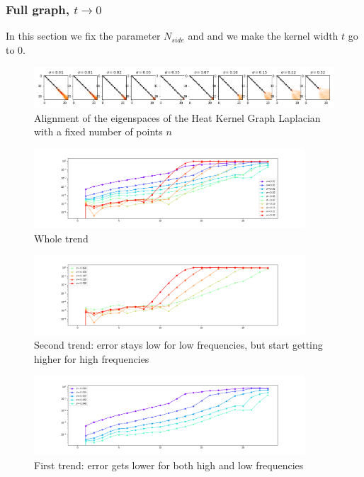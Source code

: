 \subsubsection{Full graph, $t\to 0$}
In this section we fix the parameter $N_{side}$ and and we make the kernel width $t$ go to $0$. 
\begin{figure}[h]
	\label{fig:t_sensitivity_eigenspaces}
	\caption{Alignment of the eigenspaces of the Heat Kernel Graph Laplacian with a fixed number of points $n$}
	\centering
	\includegraphics[width=1\textwidth]{../codes/02.HeatKernelGraphLaplacian/HEALPix/06_figures/t_sensitivity.png}
	
\end{figure}
\begin{figure}
	\centering
	\includegraphics[width=0.9\textwidth]{../codes/02.HeatKernelGraphLaplacian/HEALPix/06_figures/t_sensitivity_diagonal.png}
	\caption{Whole trend}
	\label{fig:t_sensitivity_diagonal}
\end{figure}%
\begin{figure}
	\centering
	\includegraphics[width=0.9\textwidth]{../codes/02.HeatKernelGraphLaplacian/HEALPix/06_figures/t_sensitivity_diagonal_2.png}
	\caption{Second trend: error stays low for low frequencies, but start getting higher for high frequencies}
	\label{fig:t_sensitivity_diagonal_2}
	\vspace{0.5cm}
\end{figure}
\begin{figure}
	\centering
	\includegraphics[width=0.9\textwidth]{../codes/02.HeatKernelGraphLaplacian/HEALPix/06_figures/t_sensitivity_diagonal_1.png}
	\caption{First trend: error gets lower for both high and low frequencies}
	\label{fig:t_sensitivity_diagonal_1}
\end{figure}%

